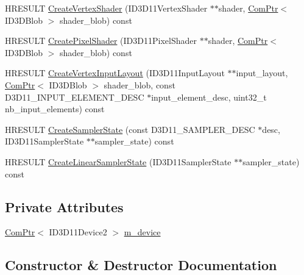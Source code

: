 \begin{DoxyCompactItemize}
H\+R\+E\+S\+U\+LT \hyperlink{classmage_1_1_rendering_device_af3825646c575b645b57d12639eaa15ca}{Create\+Vertex\+Shader} (I\+D3\+D11\+Vertex\+Shader $\ast$$\ast$shader, \hyperlink{namespacemage_ae74f374780900893caa5555d1031fd79}{Com\+Ptr}$<$ I\+D3\+D\+Blob $>$ shader\+\_\+blob) const
\item 
H\+R\+E\+S\+U\+LT \hyperlink{classmage_1_1_rendering_device_a68a23d85d973e4baffa31a0a91c55ca1}{Create\+Pixel\+Shader} (I\+D3\+D11\+Pixel\+Shader $\ast$$\ast$shader, \hyperlink{namespacemage_ae74f374780900893caa5555d1031fd79}{Com\+Ptr}$<$ I\+D3\+D\+Blob $>$ shader\+\_\+blob) const
\item 
H\+R\+E\+S\+U\+LT \hyperlink{classmage_1_1_rendering_device_a4f3918a76c9d8172df6252c37d9bedb4}{Create\+Vertex\+Input\+Layout} (I\+D3\+D11\+Input\+Layout $\ast$$\ast$input\+\_\+layout, \hyperlink{namespacemage_ae74f374780900893caa5555d1031fd79}{Com\+Ptr}$<$ I\+D3\+D\+Blob $>$ shader\+\_\+blob, const D3\+D11\+\_\+\+I\+N\+P\+U\+T\+\_\+\+E\+L\+E\+M\+E\+N\+T\+\_\+\+D\+E\+SC $\ast$input\+\_\+element\+\_\+desc, uint32\+\_\+t nb\+\_\+input\+\_\+elements) const
\item 
H\+R\+E\+S\+U\+LT \hyperlink{classmage_1_1_rendering_device_a66270dc7a4c1663a11eda58df73c135d}{Create\+Sampler\+State} (const D3\+D11\+\_\+\+S\+A\+M\+P\+L\+E\+R\+\_\+\+D\+E\+SC $\ast$desc, I\+D3\+D11\+Sampler\+State $\ast$$\ast$sampler\+\_\+state) const
\item 
H\+R\+E\+S\+U\+LT \hyperlink{classmage_1_1_rendering_device_a366f60212c1f83348e9b2899e65c6602}{Create\+Linear\+Sampler\+State} (I\+D3\+D11\+Sampler\+State $\ast$$\ast$sampler\+\_\+state) const
\end{DoxyCompactItemize}
\subsection*{Private Attributes}
\begin{DoxyCompactItemize}
\item 
\hyperlink{namespacemage_ae74f374780900893caa5555d1031fd79}{Com\+Ptr}$<$ I\+D3\+D11\+Device2 $>$ \hyperlink{classmage_1_1_rendering_device_a157a9361117c6ac021b044bcb9f7c1e6}{m\+\_\+device}
\end{DoxyCompactItemize}


\subsection{Constructor \& Destructor Documentation}
\hypertarget{classmage_1_1_rendering_device_a45e633feaaa5ab50ca0aa5ebe0c9d3ad}{}\label{classmage_1_1_rendering_device_a45e633feaaa5ab50ca0aa5ebe0c9d3ad} 
